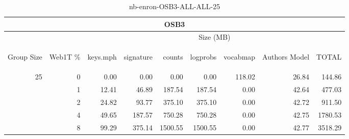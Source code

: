 \begin{center}
\begin{table}[htbp] 
 \begin{center}
\begin{tabular}{ | r | r | r | r | r | r | r | r | r |}
\hline
\multicolumn{9}{|c|}{OSB3}\\
\hline
 & & \multicolumn{7}{|c|}{Size (MB)}\\ \cline{3-9}
\begin{sideways}Group Size\end{sideways} & \begin{sideways}Web1T \% \end{sideways} & \begin{sideways}keys.mph\end{sideways} & \begin{sideways}signature\end{sideways} & \begin{sideways}counts\end{sideways} & \begin{sideways}logprobs\end{sideways} & \begin{sideways}vocabmap\end{sideways} & \begin{sideways}Authors Model \end{sideways} & \begin{sideways}TOTAL\end{sideways}\\
\hline
\multirow{4}{*}{25}
 & 0 & 0.00 & 0.00 & 0.00 & 0.00 & 118.02 & 26.84 & 144.86\\ \cline{2-9}
 & 1 & 12.41 & 46.89 & 187.54 & 187.54 & 0.00 & 42.64 & 477.03\\ \cline{2-9}
 & 2 & 24.82 & 93.77 & 375.10 & 375.10 & 0.00 & 42.72 & 911.50\\ \cline{2-9}
 & 4 & 49.65 & 187.57 & 750.28 & 750.28 & 0.00 & 42.75 & 1780.53\\ \cline{2-9}
 & 8 & 99.29 & 375.14 & 1500.55 & 1500.55 & 0.00 & 42.77 & 3518.29\\ \cline{2-9}
\hline
\end{tabular}
\caption{nb-enron-OSB3-ALL-ALL-25}
\label{table:nb-enron-OSB3-ALL-ALL-25}
\end{center}
 \end{table}
\end{center}

